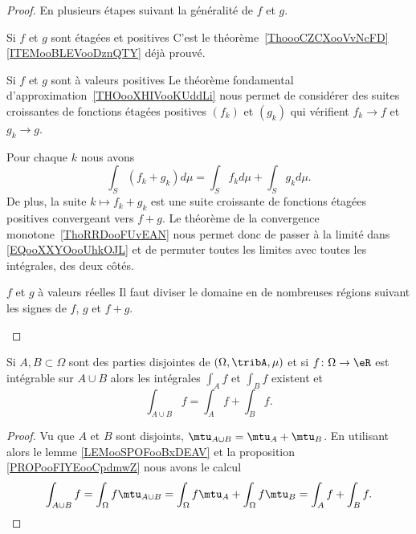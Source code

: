 \begin{proof}
    En plusieurs étapes suivant la généralité de \( f\) et \( g\).
    \begin{subproof}
        \item[Si \( f\) et \( g\) sont étagées et positives]
            C'est le théorème~\ref{ThoooCZCXooVvNcFD}\ref{ITEMooBLEVooDznQTY} déjà prouvé.
        \item[Si \(f\) et \( g\) sont à valeurs positives]
            Le théorème fondamental d'approximation~\ref{THOooXHIVooKUddLi} nous permet de considérer des suites croissantes de fonctions étagées positives \( (f_k)\) et \( (g_k)\) qui vérifient \( f_k\to f\) et \( g_k\to g\).

            Pour chaque \( k\) nous avons
            \begin{equation}        \label{EQooXXYOooUhkOJL}
                \int_S(f_k+g_k)d\mu=\int_Sf_kd\mu+\int_Sg_kd\mu.
            \end{equation}
            De plus, la suite \( k\mapsto f_k+g_k\) est une suite croissante de fonctions étagées positives convergeant vers \( f+g\). Le théorème de la convergence monotone~\ref{ThoRRDooFUvEAN} nous permet donc de passer à la limité dans \eqref{EQooXXYOooUhkOJL} et de permuter toutes les limites avec toutes les intégrales, des deux côtés.
        \item[\( f\) et \( g\) à valeurs réelles]
            Il faut diviser le domaine en de nombreuses régions suivant les signes de \( f\), \( g\) et \( f+g\).
    \end{subproof}
\end{proof}

\begin{proposition}     \label{PropOPSCooVpzaBt}
    Si \( A,B\subset \Omega\) sont des parties disjointes de \( (\Omega,\tribA,\mu)\) et si \( f\colon \Omega\to \eR\) est intégrable sur \( A\cup B\) alors les intégrales \( \int_Af\) et \( \int_Bf\) existent et
    \begin{equation}
        \int_{A\cup B}f=\int_Af+\int_Bf.
    \end{equation}
\end{proposition}

\begin{proof}
    Vu que \( A\) et \( B\) sont disjoints, \( \mtu_{A\cup B}=\mtu_A+\mtu_B\). En utilisant alors le lemme \ref{LEMooSPOFooBxDEAV} et la proposition \ref{PROPooFIYEooCpdmwZ} nous avons le calcul
    \begin{equation}
        \int_{A\cup B}f=\int_{\Omega}f\mtu_{A\cup B}=\int_{\Omega} f\mtu_A+\int_{\Omega}f\mtu_B=\int_Af+\int_Bf.
    \end{equation}
\end{proof}

